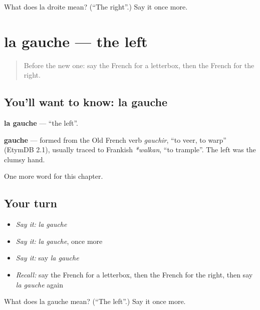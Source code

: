 \begin{tcolorbox}[breakable,colback=teal!4,colframe=teal!35!black,title={Before you move on}]
What does la droite mean? (\textquotedblleft{}The right\textquotedblright{}.) Say it once more.
\end{tcolorbox}
\section[la gauche]{la gauche — the left}

\label{lesson:FR-C110-gauche}



\begin{quote}
Before the new one: say the French for a letterbox, then the French for the right.
\end{quote}

\subsection*{You'll want to know: la gauche}
\textbf{la gauche} — \textquotedblleft{}the left\textquotedblright{}.

\begin{cousinweb}
\textbf{gauche} — formed from the Old French verb \emph{gauchir}, \textquotedblleft{}to veer, to warp\textquotedblright{} (EtymDB 2.1), usually traced to Frankish \emph{*walkan}, \textquotedblleft{}to trample\textquotedblright{}. The left was the clumsy hand.
\end{cousinweb}

\begin{grammarlens}[title={What you've built}]
One more word for this chapter.
\end{grammarlens}

\subsection*{Your turn}
\begin{itemize}
\raggedright
  \item \emph{Say it:} \emph{la gauche}
  \item \emph{Say it:} \emph{la gauche}, once more
  \item \emph{Say it:} say \emph{la gauche}
  \item \emph{Recall:} say the French for a letterbox, then the French for the right, then say \emph{la gauche} again
\end{itemize}

\begin{tcolorbox}[breakable,colback=teal!4,colframe=teal!35!black,title={Before you move on}]
What does la gauche mean? (\textquotedblleft{}The left\textquotedblright{}.) Say it once more.
\end{tcolorbox}
